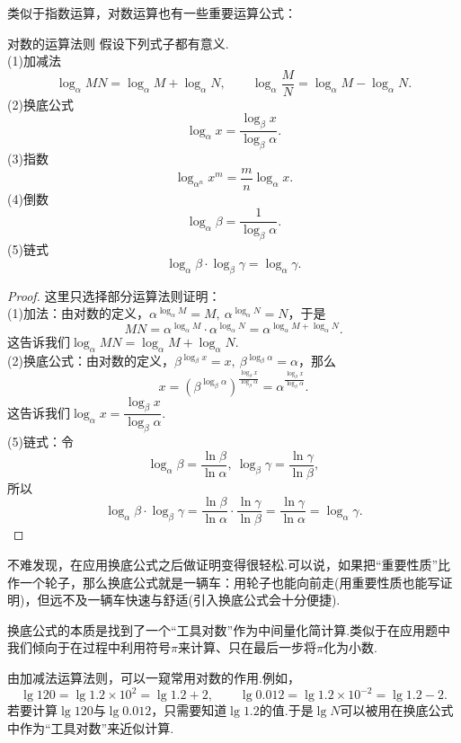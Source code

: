 \documentclass[lang=cn, zihao=5]{elegantbook}
\begin{document}
类似于指数运算，对数运算也有一些重要运算公式：

\begin{proposition}{对数的运算法则}
	假设下列式子都有意义. \\
	(1)加减法$$\log_{\alpha}{MN} = \log_{\alpha}{M} + \log_{\alpha}{N}, \qquad \log_{\alpha}{\frac{M}{N}} = \log_{\alpha}{M} - \log_{\alpha}{N}.$$
	(2)换底公式$$\log_{\alpha}{x} = \frac{\log_{\beta}{x}}{\log_{\beta}{\alpha}}.$$
	(3)指数$$\log_{\alpha ^n}{x^m} = \frac{m}{n} \log_{\alpha}{x}.$$
	(4)倒数$$\log_{\alpha}{\beta} = \frac{1}{\log_{\beta}{\alpha}}.$$
	(5)链式$$\log_{\alpha}{\beta} \cdot \log_{\beta}{\gamma} = \log_{\alpha}{\gamma}.$$
\end{proposition}
\begin{proof}
	这里只选择部分运算法则证明： \\
	(1)加法：由对数的定义，$\alpha ^{\log_{\alpha}{M}} = M,~\alpha ^{\log_{\alpha}{N}} = N$，于是$$MN = \alpha ^{\log_{\alpha}{M}} \cdot \alpha ^{\log_{\alpha}{N}} = \alpha ^{\log_{\alpha}{M} + \log_{\alpha}{N}}.$$
	这告诉我们$\log_{\alpha}{MN} = \log_{\alpha}{M} + \log_{\alpha}{N}$. \\
	(2)换底公式：由对数的定义，$\beta ^{\log_{\beta}{x}} = x,~\beta ^{\log_{\beta}{\alpha}} = \alpha$，那么$$x = (\beta ^{\log_{\beta}{\alpha}})^{\frac{\log_{\beta}{x}}{\log_{\beta}{\alpha}}} = \alpha ^{\frac{\log_{\beta}{x}}{\log_{\beta}{\alpha}}}.$$
	这告诉我们$\log_{\alpha}{x} = \dfrac{\log_{\beta}{x}}{\log_{\beta}{\alpha}}$. \\
	(5)链式：令$$\log_{\alpha}{\beta} = \frac{\ln{\beta}}{\ln{\alpha}},~ \log_{\beta}{\gamma} = \frac{\ln{\gamma}}{\ln{\beta}},$$
	所以$$\log_{\alpha}{\beta} \cdot \log_{\beta}{\gamma} = \frac{\ln{\beta}}{\ln{\alpha}} \cdot \frac{\ln{\gamma}}{\ln{\beta}} = \frac{\ln{\gamma}}{\ln{\alpha}} = \log_{\alpha}{\gamma}.$$
\end{proof}
\begin{remark}
	不难发现，在应用换底公式之后做证明变得很轻松.可以说，如果把“重要性质”比作一个轮子，那么换底公式就是一辆车：用轮子也能向前走(用重要性质也能写证明)，但远不及一辆车快速与舒适(引入换底公式会十分便捷).
\end{remark}
\begin{remark}
	换底公式的本质是找到了一个“工具对数”作为中间量化简计算.类似于在应用题中我们倾向于在过程中利用符号$\pi $来计算、只在最后一步将$\pi $化为小数.
\end{remark}
\begin{remark}
	由加减法运算法则，可以一窥常用对数的作用.例如，
	$$\lg{120} = \lg{1.2 \times 10^2} = \lg{1.2}+2,\qquad \lg{0.012} = \lg{1.2 \times 10^{-2}} = \lg{1.2}-2.$$
	若要计算$\lg{120}$与$\lg{0.012}$，只需要知道$\lg{1.2}$的值.于是$\lg{N}$可以被用在换底公式中作为“工具对数”来近似计算.
\end{remark}
\end{document}
